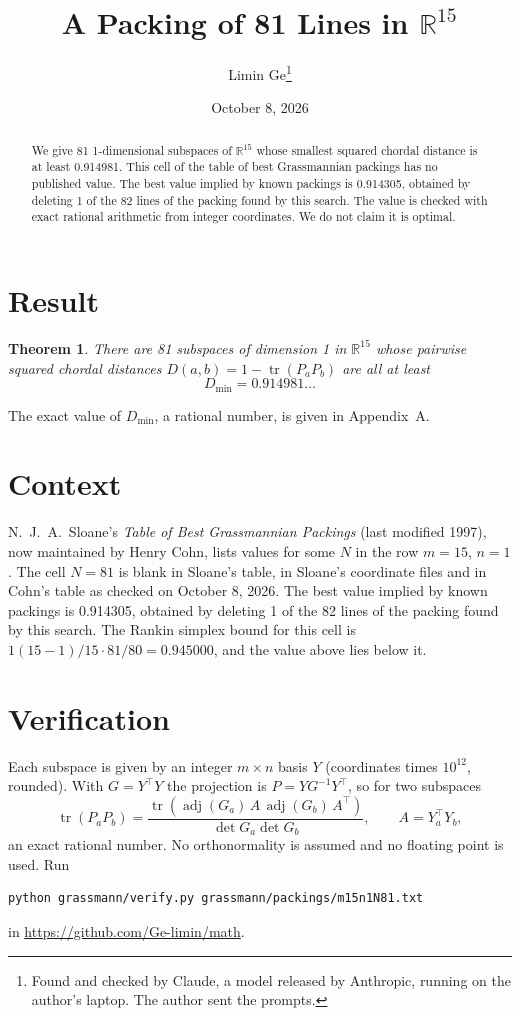 \documentclass[11pt,a4paper]{article}
\title{A Packing of 81 Lines in $\mathbb{R}^{15}$}
\author{Limin Ge\thanks{Found and checked by Claude, a model released by Anthropic, running on the author's laptop. The author sent the prompts.}}
\date{October 8, 2026}
\newtheorem*{theorem}{Theorem}
\begin{document}
\maketitle
\begin{abstract}
We give 81 1-dimensional subspaces of $\mathbb{R}^{15}$ whose smallest squared chordal distance is at least 0.914981. This cell of the table of best Grassmannian packings has no published value. The best value implied by known packings is 0.914305, obtained by deleting 1 of the 82 lines of the packing found by this search. The value is checked with exact rational arithmetic from integer coordinates. We do not claim it is optimal.
\end{abstract}

\section{Result}
\begin{theorem}
There are 81 subspaces of dimension 1 in $\mathbb{R}^{15}$ whose pairwise squared chordal distances $D(a,b) = 1 - \operatorname{tr}(P_aP_b)$ are all at least
\[ D_{\min} = 0.914981\ldots \]
\end{theorem}
The exact value of $D_{\min}$, a rational number, is given in Appendix~A.


\section{Context}
N.~J.~A.~Sloane's \emph{Table of Best Grassmannian Packings} (last modified 1997), now maintained by Henry Cohn, lists values for some $N$ in the row $m=15$, $n=1$. The cell $N=81$ is blank in Sloane's table, in Sloane's coordinate files and in Cohn's table as checked on October 8, 2026. The best value implied by known packings is 0.914305, obtained by deleting 1 of the 82 lines of the packing found by this search. The Rankin simplex bound for this cell is $1(15-1)/15\cdot 81/80 = 0.945000$, and the value above lies below it.


\section{Verification}
Each subspace is given by an integer $m\times n$ basis $Y$ (coordinates times $10^{12}$, rounded). With $G=Y^\top Y$ the projection is $P=YG^{-1}Y^\top$, so for two subspaces
\[ \operatorname{tr}(P_aP_b)=\frac{\operatorname{tr}(\operatorname{adj}(G_a)\,A\,\operatorname{adj}(G_b)\,A^\top)}{\det G_a\det G_b},\qquad A=Y_a^\top Y_b, \]
an exact rational number. No orthonormality is assumed and no floating point is used. Run
\begin{verbatim}
python grassmann/verify.py grassmann/packings/m15n1N81.txt
\end{verbatim}
in \url{https://github.com/Ge-limin/math}.
\end{document}
